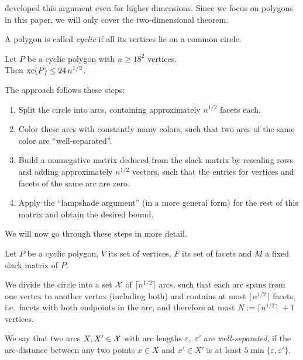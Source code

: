 \citeauthor{kwan2020extension} developed this argument even for higher dimensions. Since we focus on polygons in this paper, we will only cover the two-dimensional theorem.

\begin{definition}
  A polygon is called \emph{cyclic} if all its vertices lie on a common circle.
\end{definition}

\begin{theorem}\label{theorem:cyclic-xc}
  Let $P$ be a cyclic polygon with $n \geq 18^2$ vertices.\\
  Then $\operatorname{xc}(P) \leq 24\,n^{1/2}$.
\end{theorem}

The approach follows these steps:

\begin{enumerate}
  \item Split the circle into arcs, containing approximately $n^{1/2}$ facets each.
  \item Color these arcs with constantly many colors, such that two arcs of the same color are ``well-separated''.
  \item Build a nonnegative matrix deduced from the slack matrix by rescaling rows and adding approximately $n^{1/2}$ vectors, such that the entries for vertices and facets of the same arc are zero.
  \item Apply the ``lampshade argument'' (in a more general form) for the rest of this matrix and obtain the desired bound.
\end{enumerate}

We will now go through these steps in more detail.

Let $P$ be a cyclic polygon, $V$ its set of vertices, $F$ its set of facets and $M$ a fixed slack matrix of $P$.

We divide the circle into a set $\mathcal{X}$ of $\lceil n^{1/2} \rceil$ arcs, such that each arc spans from one vertex to another vertex (including both) and contains at most $\lceil n^{1/2} \rceil$ facets, i.e.\ facets with both endpoints in the arc, and therefore at most $N := \lceil n^{1/2} \rceil\ + 1$ vertices.

\begin{definition}\label{def:well-separated}
  We say that two arcs $X,X' \in \mathcal{X}$ with arc lengths $\varepsilon$,~$\varepsilon'$ are \emph{well-separated}, if the arc-distance between any two points $x \in X$ and $x' \in X'$ is at least $5 \min\{\varepsilon, \varepsilon'\}$.
\end{definition}

